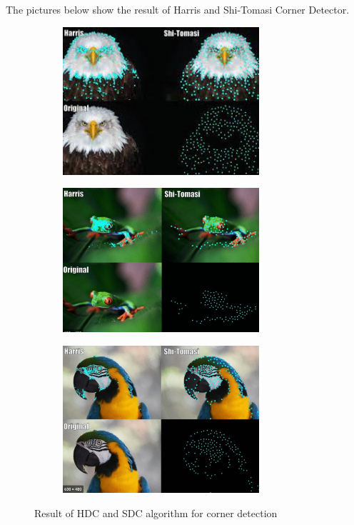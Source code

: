 \documentclass[a4paper, 12pt]{article}
\begin{document}
The pictures below show the result of Harris and Shi-Tomasi Corner Detector.

\begin{figure}[H]
    \centering
    \begin{subfigure}{0.3\textwidth}
        \centering
        \includegraphics[width=0.8\textwidth]{HDC-SDC-1.jpeg}
    \end{subfigure}
    \begin{subfigure}{0.3\textwidth}
        \centering
        \includegraphics[width=0.8\textwidth]{HDC-SDC-2.png}
    \end{subfigure}
    \begin{subfigure}{0.3\textwidth}
        \centering
        \includegraphics[width=0.8\textwidth]{HDC-SDC-3.png}
    \end{subfigure}
    \caption{Result of HDC and SDC algorithm for corner detection}
\end{figure}
\end{document}
